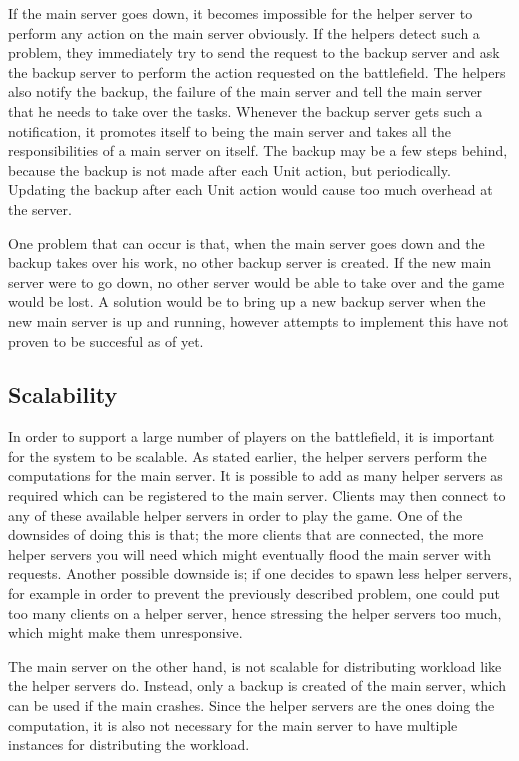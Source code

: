If the main server goes down, it becomes impossible for the helper server to perform any action on the main server obviously.
If the helpers detect such a problem, they immediately try to send the request to the backup server and ask the backup server to perform the action requested on the battlefield.
The helpers also notify the backup, the failure of the main server and tell the main server that he needs to take over the tasks.
Whenever the backup server gets such a notification, it promotes itself to being the main server and takes all the responsibilities of a main server on itself.
The backup may be a few steps behind, because the backup is not made after each Unit action, but periodically. 
Updating the backup after each Unit action would cause too much overhead at the server. 

One problem that can occur is that, when the main server goes down and the backup takes over his work, no other backup server is created. 
If the new main server were to go down, no other server would be able to take over and the game would be lost. 
A solution would be to bring up a new backup server when the new main server is up and running, however attempts to implement this have not proven to be succesful as of yet.

\subsection{Scalability}
In order to support a large number of players on the battlefield, it is important for the system to be scalable.
As stated earlier, the helper servers perform the computations for the main server.
It is possible to add as many helper servers as required which can be registered to the main server.
Clients may then connect to any of these available helper servers in order to play the game. One of the downsides of doing this is that; the more clients that are connected, the more helper servers you will need which might eventually flood the main server with requests. Another possible downside is; if one decides to spawn less helper servers, for example in order to prevent the previously described problem, one could put too many clients on a helper server, hence stressing the helper servers too much, which might make them unresponsive.

The main server on the other hand, is not scalable for distributing workload like the helper servers do. 
Instead, only a backup is created of the main server, which can be used if the main crashes.
Since the helper servers are the ones doing the computation, it is also not necessary for the main server to have multiple instances for distributing the workload.
 

